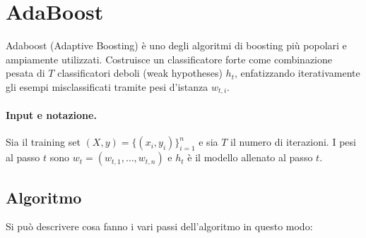 \section{AdaBoost}
Adaboost (Adaptive Boosting) è uno degli algoritmi di boosting più popolari e ampiamente utilizzati. Costruisce un classificatore forte come combinazione pesata di $T$ classificatori deboli (weak hypotheses) $h_t$, enfatizzando iterativamente gli esempi misclassificati tramite pesi d'istanza $w_{t,i}$.

\paragraph{Input e notazione.}
Sia il training set $(X,y)=\{(x_i,y_i)\}_{i=1}^n$ e sia $T$ il numero di iterazioni.
I pesi al passo $t$ sono $w_t=(w_{t,1},\dots,w_{t,n})$ e $h_t$ è il modello allenato al passo $t$.

\subsection{Algoritmo}
Si può descrivere cosa fanno i vari passi dell'algoritmo in questo modo:

